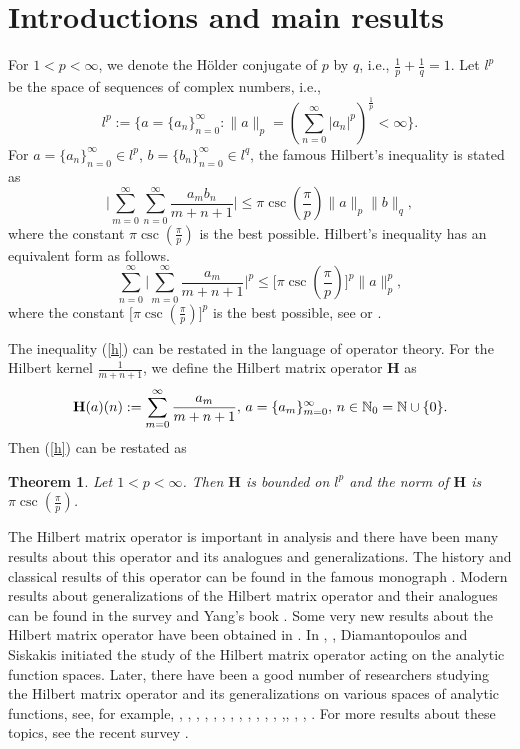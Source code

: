\documentclass[10pt]{amsart}
\newtheorem{theorem}{Theorem}[section]
\theoremstyle{definition}
\theoremstyle{question}
\numberwithin{equation}{section}
\begin{document}
\section{{\bf Introductions and main results}}

For $1<p<\infty$, we denote the H\"older conjugate of $p$ by $q$, i.e., $\frac{1}{p}+\frac{1}{q}=1$.  Let $l^p$ be the space of sequences of complex numbers, i.e.,
\begin{equation*}l^{p}:=\{a=\{a_n\}_{n=0}^{\infty}: \|a\|_{p}=(\sum_{n=0}^{\infty} |a_{n}|^p)^{\frac{1}{p}}<\infty \}.\end{equation*}
For $a=\{a_n\}_{n=0}^{\infty}\in l^{p}$, $b=\{b_n\}_{n=0}^{\infty}\in l^{q}$,  the famous Hilbert's inequality is stated as 
$$\Big|\sum_{m=0}^{\infty}\sum_{n=0}^{\infty}\frac{a_m b_n}{m+n+1}\Big|\leq \pi\csc(\frac{\pi}{p})\|a\|_p\|b\|_q,$$
where the constant $\pi\csc(\frac{\pi}{p})$ is the best possible. Hilbert's inequality has an equivalent form as follows.
\begin{equation}\label{h} \sum_{n=0}^{\infty}\Big|\sum_{m=0}^{\infty}\frac{a_m}{m+n+1}\Big|^p  \leq \Big[\pi\csc(\frac{\pi}{p})\Big]^p\|a\|_p^p,\end{equation}
where the constant $\Big[\pi\csc(\frac{\pi}{p})\Big]^p$ is the best possible, see \cite[Theorem 6]{HLP-0} or \cite[Theorem 323]{HLP}.

The inequality (\ref{h}) can be restated in the language of operator theory. For the Hilbert kernel $\frac{1}{m+n+1}$, we define the Hilbert matrix operator $\mathbf{H}$ as
$${\bf{H}}(a)(n):=\sum_{m=0}^{\infty}\frac{a_m}{m+n+1}, \,a=\{a_m\}_{m=0}^{\infty}, \,n\in \mathbb{N}_0=\mathbb{N} \cup \{0\}.$$
Then  (\ref{h}) can be restated as
\begin{theorem}\label{m-0}
Let $1<p<\infty$. Then $\mathbf{H}$ is bounded on $l^p$ and the norm of $\mathbf{H}$ is $\pi\csc(\frac{\pi}{p})$. \end{theorem}

The Hilbert matrix operator is important in analysis and there have been many results about this operator and its analogues and generalizations. The history and classical results of this operator can be found in the famous monograph \cite{HLP}. Modern results about generalizations of the Hilbert matrix operator and their analogues can be found in the survey \cite{YR} and Yang's book \cite{Y3}. Some very new results about the Hilbert matrix operator have been obtained in \cite{DGP}. In \cite{D}, \cite{DS}, Diamantopoulos and Siskakis initiated the study of the Hilbert matrix operator acting on the analytic function spaces. Later, there have been a good number of researchers studying the Hilbert matrix operator and its generalizations on various spaces of analytic functions, see, for example, \cite{BK}, \cite{Dai}, \cite{D-1}, \cite{DJV}, \cite{GGPS}, \cite{GP}, \cite{GM}, \cite{GM-2}, \cite{JTF}, \cite{Ka}, \cite{LMN}, \cite{LMW}, \cite{LS},\cite{N}, \cite{PR}, \cite{TZ}, \cite{YZ1}. For more results about these topics, see the recent survey \cite{bds}.   
\end{document}
